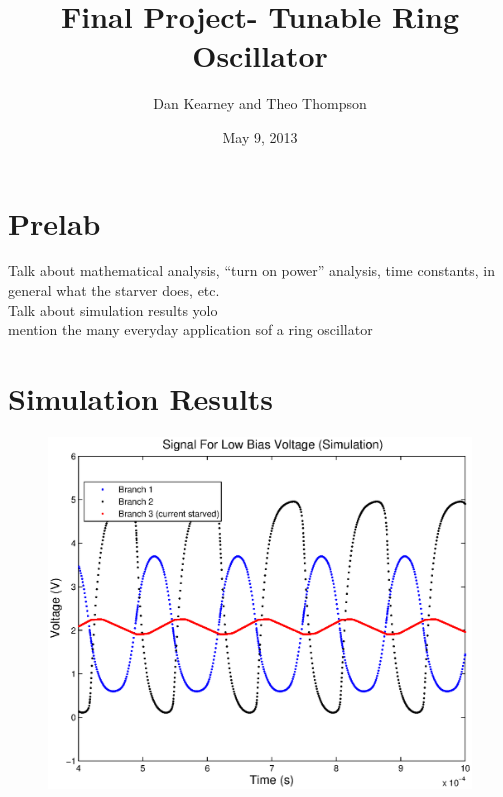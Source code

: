 \documentclass{article}
\title{Final Project- Tunable Ring Oscillator}
\author{Dan Kearney and Theo Thompson}
\date{May 9, 2013}
\begin{document}
\maketitle

\section*{Prelab}
Talk about mathematical analysis, ``turn on power'' analysis, time constants, in general what the starver does, etc.\\
Talk about simulation results yolo\\
mention the many everyday application sof a ring oscillator

\section*{Simulation Results}

\begin{figure}[H]
\centering
\includegraphics[scale=1]{lowBiasSigSim.eps}
\caption{}
\label{lowBiasSim}
\end{figure}
\end{document}
